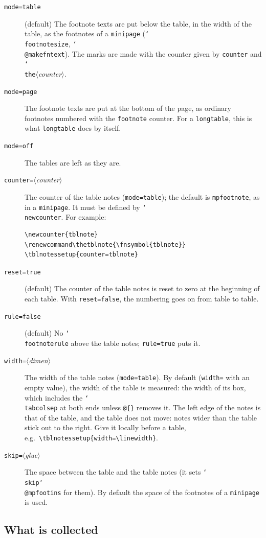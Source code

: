 \documentclass{article}
\newcommand*\cs[1]{\texttt{\char`\\#1}}
\newcommand*\key[1]{\texttt{#1}}
\newcommand*\meta[1]{$\langle$\textit{#1}$\rangle$}
\begin{document}
\begin{description}
\item[\key{mode=table}] (default) The footnote texts are put below the
  table, in the width of the table, as the footnotes of a
  \texttt{minipage} (\cs{footnotesize}, \cs{@makefntext}).  The marks
  are made with the counter given by \key{counter} and
  \cs{the}\meta{counter}.
\item[\key{mode=page}] The footnote texts are put at the bottom of the
  page, as ordinary footnotes numbered with the \texttt{footnote}
  counter.  For a \texttt{longtable}, this is what \texttt{longtable}
  does by itself.
\item[\key{mode=off}] The tables are left as they are.
\item[\key{counter=}\meta{counter}] The counter of the table notes
  (\key{mode=table}); the default is \texttt{mpfootnote}, as in a
  \texttt{minipage}.  It must be defined by \cs{newcounter}.  For
  example:
\begin{verbatim}
\newcounter{tblnote}
\renewcommand\thetblnote{\fnsymbol{tblnote}}
\tblnotessetup{counter=tblnote}
\end{verbatim}
\item[\key{reset=true}] (default) The counter of the table notes is
  reset to zero at the beginning of each table.  With
  \key{reset=false}, the numbering goes on from table to table.
\item[\key{rule=false}] (default) No \cs{footnoterule} above the table
  notes; \key{rule=true} puts it.
\item[\key{width=}\meta{dimen}] The width of the table notes
  (\key{mode=table}).  By default (\key{width=} with an empty value),
  the width of the table is measured: the width of its box, which
  includes the \cs{tabcolsep} at both ends unless \verb|@{}| removes
  it.  The left edge of the notes is that of the table, and the table
  does not move: notes wider than the table stick out to the right.
  Give it locally before a table, e.g.\
  \verb|\tblnotessetup{width=\linewidth}|.
\item[\key{skip=}\meta{glue}] The space between the table and the table
  notes (it sets \cs{skip}\cs{@mpfootins} for them).  By default the
  space of the footnotes of a \texttt{minipage} is used.
\end{description}

\subsection{What is collected}
\end{document}
